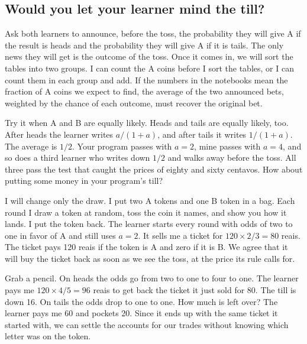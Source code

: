 \documentclass[12pt,oneside]{article}
\newcommand{\secao}[1]{\Needspace{5.2\baselineskip}\subsection*{#1}}
\begin{document}
\secao{Would you let your learner mind the till?}
Ask both learners to announce, before the toss, the probability they will give A if the result is heads and the probability they will give A if it is tails. The only news they will get is the outcome of the toss. Once it comes in, we will sort the tables into two groups. I can count the A coins before I sort the tables, or I can count them in each group and add. If the numbers in the notebooks mean the fraction of A coins we expect to find, the average of the two announced bets, weighted by the chance of each outcome, must recover the original bet.

Try it when A and B are equally likely. Heads and tails are equally likely, too. After heads the learner writes $a/(1+a)$, and after tails it writes $1/(1+a)$. The average is $1/2$. Your program passes with $a=2$, mine passes with $a=4$, and so does a third learner who writes down $1/2$ and walks away before the toss. All three pass the test that caught the prices of eighty and sixty centavos. How about putting some money in your program's till?

I will change only the draw. I put two A tokens and one B token in a bag. Each round I draw a token at random, toss the coin it names, and show you how it lands. I put the token back. The learner starts every round with odds of two to one in favor of A and still uses $a=2$. It sells me a ticket for $120\times 2/3=80$ reais. The ticket pays 120 reais if the token is A and zero if it is B. We agree that it will buy the ticket back as soon as we see the toss, at the price its rule calls for.

Grab a pencil. On heads the odds go from two to one to four to one. The learner pays me $120\times 4/5=96$ reais to get back the ticket it just sold for 80. The till is down 16. On tails the odds drop to one to one. How much is left over? The learner pays me 60 and pockets 20. Since it ends up with the same ticket it started with, we can settle the accounts for our trades without knowing which letter was on the token.
\end{document}
